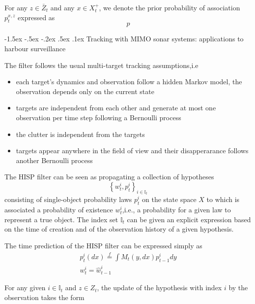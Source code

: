 \documentclass[a4paper, 11pt]{article}
\makeatletter
\newcommand{\sihao}{\fontsize{14pt}{\baselineskip}\selectfont}
\renewcommand\section{\@startsection{section}{1}{\z@}%
{-1.5ex \@plus -.5ex \@minus -.2ex}%
{.5ex \@plus .1ex}%
{\normalfont\sihao\CJKfamily{hei}}}
\makeatother
\begin{document}
\begin{CJK}{UTF8}{gbsn}
For any $z \in \bar{Z}_t$ and any $x \in X_t^+$, we denote the prior probability of association $p_t^{x,z}$ expressed as
\begin{equation}
p
\end{equation}



\section{Tracking with MIMO sonar systems: applications
to harbour surveillance}

The filter follows the usual multi-target tracking assumptions,i.e
\begin{itemize}
\item each target's dynamics and observation follow a hidden Markov model, the observation depends only on the current state
\item targets are independent from each other and generate at most one observation per time step following a Bernoulli process
\item the clutter is independent from the targets
\item targets appear anywhere in the field of view and their disapperarance follows another Bernoulli process
\end{itemize}

The HISP filter can be seen as propagating a collection of hypotheses
\begin{equation}
\left\{w_t^i,p_t^i \right\}_{i \in \mathbb{I}_t}
\end{equation}
consisting of single-object probability laws $p_t^i$ on the state space $X$ to which is associated a probability of existence $w_t^i$,i.e., a probability for a given law to represent a true object. The index set $\mathbb{I}_t$ can be given an explicit expression based on the  time of creation and of the observation history of a given hypothesis.

The time prediction of the HISP filter can be expressed simply as
\begin{equation}
\begin{aligned}
p_t^i(dx)\overset{f}{=} \int M_t(y,dx)p_{t-1}^i dy\\
w_t^i = \hat{w}_{t-1}^i
\end{aligned}
\end{equation}

For any given $i \in \mathbb{I}_t$ and $z \in Z_t$, the update of the hypothesis with index $i$ by the observation takes the form


\end{CJK}
\end{document}
